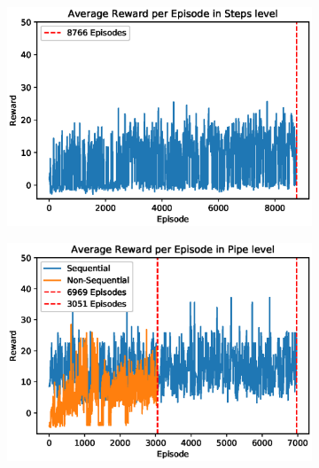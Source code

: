 \documentclass[notitlepage,a4paper,11pt]{article}
\begin{document}
\begin{figure}[htb!]
     \centering
     \begin{subfigure}[t]{0.32\textwidth}
         \centering
         \includegraphics[width=\textwidth]{figs/fun_results_1.eps}
         \caption{}
         \label{fig:fun_results_1}
     \end{subfigure}
     \hfill
     \begin{subfigure}[t]{0.32\textwidth}
         \centering
         \includegraphics[width=\textwidth]{figs/fun_results_2.eps}
         \caption{}
         \label{fig:fun_results_2}
     \end{subfigure}
     \hfill
     \begin{subfigure}[t]{0.32\textwidth}
         \centering

\end{subfigure}
\end{figure}
\end{document}
